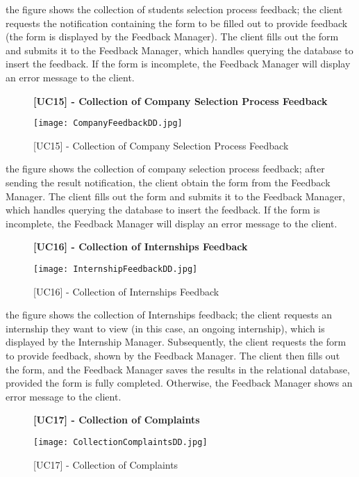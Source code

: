 		the figure shows the collection of students selection process feedback; the client requests the notification containing the form to be filled out to provide feedback (the form is displayed by the Feedback Manager). The client fills out the form and submits it to the Feedback Manager, which handles querying the database to insert the feedback. If the form is incomplete, the Feedback Manager will display an error message to the client.
		
		
		\begin{figure}[H]
			\centering
			{\bfseries [UC15] - Collection of Company Selection Process Feedback}
			\caption{[UC15] - Collection of Company Selection Process Feedback}
			\texttt{[image: CompanyFeedbackDD.jpg]}
			
		\end{figure}
		
		
		the figure shows the collection of company selection process feedback; after sending the result notification, the client obtain the form from the Feedback Manager. The client fills out the form and submits it to the Feedback Manager, which handles querying the database to insert the feedback. If the form is incomplete, the Feedback Manager will display an error message to the client.
		
		
		\begin{figure}[H]
			\centering
			{\bfseries [UC16] - Collection of Internships Feedback}
			\caption{[UC16] - Collection of Internships Feedback}
			\texttt{[image: InternshipFeedbackDD.jpg]}
			
		\end{figure}
		
		the figure shows the collection of Internships feedback; the client requests an internship they want to view (in this case, an ongoing internship), which is displayed by the Internship Manager. Subsequently, the client requests the form to provide feedback, shown by the Feedback Manager. The client then fills out the form, and the Feedback Manager saves the results in the relational database, provided the form is fully completed. Otherwise, the Feedback Manager shows an error message to the client.
		
		
		
		
		\begin{figure}[H]
			\centering
			{\bfseries [UC17] - Collection of Complaints}
			\caption{[UC17] - Collection of Complaints}
			\texttt{[image: CollectionComplaintsDD.jpg]}
			
		\end{figure}
		
